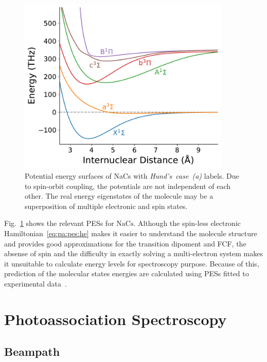 \begin{figure}
  \centering
  \includegraphics[width=0.9\textwidth]{figures/pa_pes.pdf}
  \caption[NaCs potential energy surfaces]{
    Potential energy surfaces of NaCs with \textit{Hund's~case~(a)} labels.
    Due to spin-orbit coupling, the potentials are not independent of each other.
    The real energy eigenstates of the molecule may be a superposition of multiple
    electronic and spin states.
    \label{fig:pa:pes}}
\end{figure}

Fig.~\ref{fig:pa:pes} shows the relevant PESs for $\mathrm{NaCs}$.
Although the spin-less electronic Hamiltonian~\ref{eq:pa:pes:he} makes it easier
to understand the molecule structure and provides good approximations for the
transition dipoment and FCF, the absense of spin and the difficulty in exactly solving
a multi-electron system makes it unsuitable to calculate energy levels
for spectroscopy purpose.
Because of this, prediction of the molecular states energies are calculated using
PESs fitted to experimental data~\cite{docenko_coupling_2006,zaharova_solution_2009,grochola_spin-forbidden_2011,grochola_investigation_2010}.

\section{Photoassociation Spectroscopy}
\label{ch:pa:pa}

\subsection{Beampath}
\label{ch:pa:beampath}

